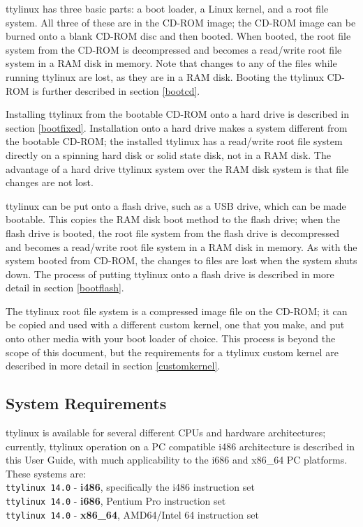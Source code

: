 \documentclass[10pt]{article}
\begin{document}
ttylinux has three basic parts: a boot loader, a Linux kernel, and a root
file system. All three of these are in the CD-ROM image; the CD-ROM image can
be burned onto a blank CD-ROM disc and then booted. When booted, the root
file system from the CD-ROM is decompressed and becomes a read/write root file
system in a RAM disk in memory. Note that changes to any of the files while
running ttylinux are lost, as they are in a RAM disk. Booting the ttylinux
CD-ROM is further described in section \ref{bootcd}.

Installing ttylinux from the bootable CD-ROM onto a hard drive is described in
section \ref{bootfixed}. Installation onto a hard drive makes a system
different from the bootable CD-ROM; the installed ttylinux has a read/write
root file system directly on a spinning hard disk or solid state disk, not in a
RAM disk. The advantage of a hard drive ttylinux system over the RAM disk
system is that file changes are not lost.

ttylinux can be put onto a flash drive, such as a USB drive, which can be made
bootable. This copies the RAM disk boot method to the flash drive; when the
flash drive is booted, the root file system from the flash drive is decompressed
and becomes a read/write root file system in a RAM disk in memory. As with the
system booted from CD-ROM, the changes to files are lost when the system shuts
down. The process of putting ttylinux onto a flash drive is described in more
detail in section \ref{bootflash}.

The ttylinux root file system is a compressed image file on the CD-ROM; it can
be copied and used with a different custom kernel, one that you make, and put
onto other media with your boot loader of choice. This process is beyond the
scope of this document, but the requirements for a ttylinux custom kernel are
described in more detail in section \ref{customkernel}.

\subsection{System Requirements}

ttylinux is available for several different CPUs and hardware architectures;
currently, ttylinux operation on a PC compatible i486 architecture is described
in this User Guide, with much applicability to the i686 and x86\_64 PC
platforms. These systems are:\\
{\tt ttylinux 14.0} - {\bf i486}, specifically the i486 instruction set\\
{\tt ttylinux 14.0} - {\bf i686}, Pentium Pro instruction set\\
{\tt ttylinux 14.0} - {\bf x86\_64}, AMD64/Intel 64 instruction set
\end{document}

